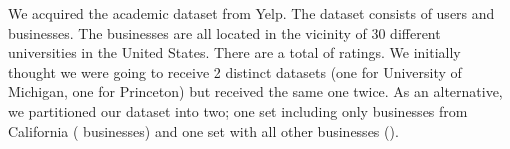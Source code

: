 
We acquired the academic dataset from Yelp\cite{yelp}. The dataset consists of
\numUserTotal users and \numBusTotal businesses. The businesses are all located
in the vicinity of $30$ different universities in the United States. There are
a total of \numRatingTotal ratings. We initially thought we were going to
receive 2 distinct datasets (one for University of Michigan, one for Princeton)
but received the same one twice.  As an alternative, we partitioned our dataset
into two; one set including only businesses from California (\numBusCA
businesses) and one set with all other businesses (\numBusOthernsp).






